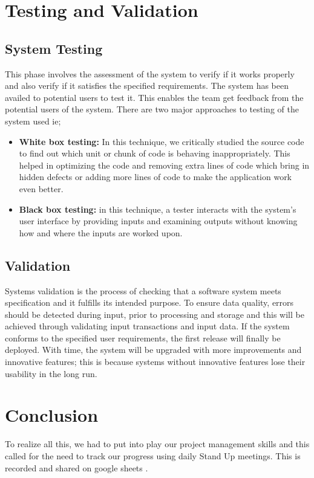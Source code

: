 \section{Testing and Validation}
\subsection{System Testing}
This phase involves the assessment of the system to verify if it works properly and also verify if it satisfies the specified requirements. The system has been availed to potential users to test it. This enables the team get feedback from the potential users of the system.
There are two major approaches to testing of the system used ie;
\begin{itemize}
\item \textbf{White box testing:} In this technique, we critically studied the source code to find out which unit or chunk of code is behaving inappropriately. This helped in optimizing the code and removing extra lines of code which bring in hidden defects or adding more lines of code to make the application work even better.

\item \textbf{Black box testing:} in this technique, a tester interacts with the system’s user interface by providing inputs and examining outputs without knowing how and where the inputs are worked upon. 
\end{itemize}

\subsection{Validation}
Systems validation is the process of checking that a software system meets specification and it fulfills its intended purpose. To ensure data quality, errors should be detected during input, prior to processing and storage and this will be achieved through validating input transactions and input data. If the system conforms to the specified user requirements, the first release will finally be deployed. With time, the system will be upgraded with more improvements and innovative features; this is because systems without innovative features lose their usability in the long run.

\section{Conclusion}
To realize all this, we had to put into play our project management skills and this called for the need to track our progress using daily Stand Up meetings. This is recorded and shared on google sheets \cite{art6}.


